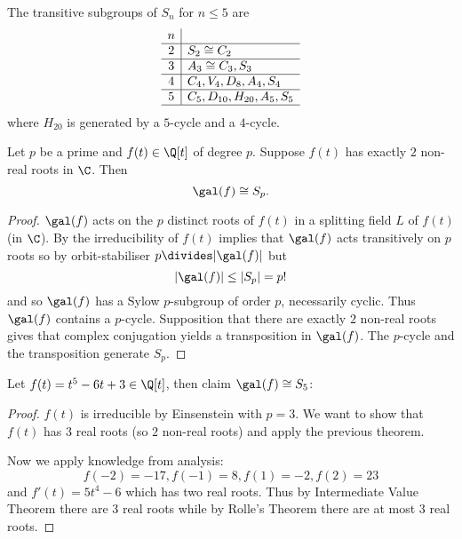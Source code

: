 \documentclass[a4paper]{article}
\begin{document}
\begin{lemma}
  \label{lem:transitive subgroups of Sn}
  The transitive subgroups of \(S_n\) for \(n \leq 5\) are
  \[
  \begin{array}[h]{c|l}
    n & \\ \hline
    2 & S_2 \cong C_2 \\ \hline
    3 & A_3 \cong C_3, S_3 \\ \hline
    4 & C_4, V_4, D_8, A_4, S_4 \\ \hline
    5 & C_5, D_{10}, H_{20}, A_5, S_5 \\ \hline
  \end{array}
  \]
  where \(H_{20}\) is generated by a \(5\)-cycle and a \(4\)-cycle.
\end{lemma}

\begin{theorem}
  Let \(p\) be a prime and \(f(t) \in \Q[t]\) of degree \(p\). Suppose \(f(t)\) has exactly \(2\) non-real roots in \(\C\). Then
  \[
    \gal(f) \cong S_p.
  \]
\end{theorem}

\begin{proof}
  \(\gal(f)\) acts on the \(p\) distinct roots of \(f(t)\) in a splitting field \(L\) of \(f(t)\) (in \(\C\)). By  the irreducibility of \(f(t)\) implies that \(\gal(f)\) acts transitively on \(p\) roots so by orbit-stabiliser \(p \divides |\gal(f)|\) but
  \[
    |\gal(f)| \leq |S_p| = p!
  \]
  and so \(\gal(f)\) has a Sylow \(p\)-subgroup of order \(p\), necessarily cyclic. Thus \(\gal(f)\) contains a \(p\)-cycle. Supposition that there are exactly \(2\) non-real roots gives that complex conjugation yields a transposition in \(\gal(f)\). The \(p\)-cycle and the transposition generate \(S_p\).
\end{proof}

\begin{eg}
  Let \(f(t) = t^5 - 6t + 3 \in \Q[t]\), then claim \(\gal(f) \cong S_5\):

  \begin{proof}
    \(f(t)\) is irreducible by Einsenstein with \(p = 3\). We want to show that \(f(t)\) has \(3\) real roots (so \(2\) non-real roots) and apply the previous theorem.

    Now we apply knowledge from analysis:
    \[
      f(-2) = -17, f(-1) = 8, f(1) = -2, f(2) = 23
    \]
    and \(f'(t) = 5t^4 - 6\) which has two real roots. Thus by Intermediate Value Theorem there are \(3\) real roots while by Rolle's Theorem there are at most \(3\) real roots.
  \end{proof}
\end{eg}
\end{document}
